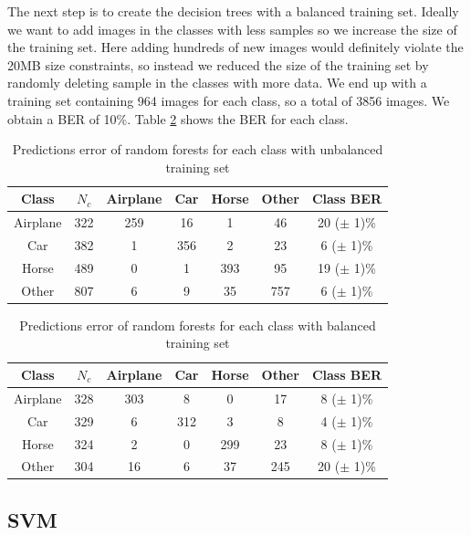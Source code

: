 \documentclass{article} %
\begin{document}
The next step is to create the decision trees with a balanced training set. Ideally we want to add images in the classes with less samples so we increase the size of the training set.
Here adding hundreds of new images would definitely violate the 20MB size constraints, so instead we reduced the size of the training set by randomly deleting sample in the classes with more data. 
We end up with a training set containing 964 images for each class, so a total of 3856 images. 
We obtain a BER of 10\%. Table \ref{tbl:errClassBal} shows the BER for each class.

\begin{table}[!htb]
	\centering
		\begin{tabular}{|c|c|c|c|c|c|c|}
			\hline Class & $N_{c}$ & Airplane & Car & Horse & Other & Class BER \\ 
			\hline Airplane    & 322 & 259 & 16 & 1 & 46 & 20 ($\pm$ 1)\% \\ 
			\hline Car         & 382 & 1 & 356 & 2 & 23 & 6 ($\pm$ 1)\% \\ 
			\hline Horse       & 489 & 0 & 1 & 393 & 95 & 19 ($\pm$ 1)\% \\ 
			\hline Other       & 807 & 6 & 9 & 35 & 757 & 6 ($\pm$ 1)\% \\ 
			\hline 
		\end{tabular} 
		\caption{Predictions error of random forests for each class with unbalanced training set}
		\label{tbl:errClassNotBal}
\end{table}

\begin{table}
	\centering
	\begin{tabular}{|c|c|c|c|c|c|c|}
		\hline Class     & $N_{c}$ & Airplane & Car & Horse & Other & Class BER \\ 
		\hline Airplane  & 328 & 303 & 8 & 0 & 17 & 8 ($\pm$ 1)\% \\ 
		\hline Car       & 329 & 6 & 312 & 3 & 8 & 4 ($\pm$ 1)\% \\ 
		\hline Horse     & 324 & 2 & 0 & 299 & 23 & 8 ($\pm$ 1)\% \\ 
		\hline Other     & 304 & 16 & 6 & 37 & 245 & 20 ($\pm$ 1)\% \\ 
		\hline 
	\end{tabular} 
	\caption{Predictions error of random forests for each class with balanced training set}
	\label{tbl:errClassBal}
\end{table}


\subsection{SVM}
\end{document}
